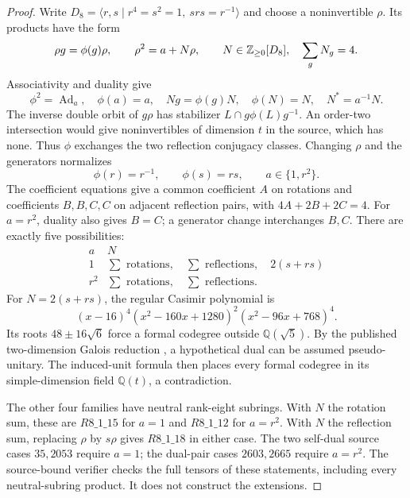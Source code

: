 \begin{proof}
Write $D_8=\langle r,s\mid r^4=s^2=1,\ srs=r^{-1}\rangle$ and
choose a noninvertible $\rho$. Its products have the form
\[
 \rho g=\phi(g)\rho,\qquad \rho^2=a+N\rho,
 \qquad N\in\mathbb Z_{\geq0}[D_8],\quad \sum_gN_g=4.
\]
Associativity and duality give
\[
 \phi^2=\operatorname{Ad}_a,\quad\phi(a)=a,\quad
 Ng=\phi(g)N,\quad\phi(N)=N,\quad N^*=a^{-1}N.
\]
The inverse double orbit of $g\rho$ has stabilizer
$L\cap g\phi(L)g^{-1}$. An order-two intersection would give
noninvertibles of dimension $t$ in the source, which has none.
Thus $\phi$ exchanges the two reflection conjugacy classes.
Changing $\rho$ and the generators normalizes
\[
 \phi(r)=r^{-1},\qquad\phi(s)=rs,\qquad a\in\{1,r^2\}.
\]
The coefficient equations give a common coefficient $A$ on rotations
and coefficients $B,B,C,C$ on adjacent reflection pairs, with
$4A+2B+2C=4$. For $a=r^2$, duality also gives $B=C$; a generator
change interchanges $B,C$. There are exactly five possibilities:
\[
\begin{array}{c|c}
a&N\\\hline
1&\sum\text{ rotations},\quad\sum\text{ reflections},\quad2(s+rs)\\
r^2&\sum\text{ rotations},\quad\sum\text{ reflections}.
\end{array}
\]
For $N=2(s+rs)$, the regular Casimir polynomial is
\[
 (x-16)^4(x^2-160x+1280)^2(x^2-96x+768)^4.
\]
Its roots $48\pm16\sqrt6$ force a formal codegree outside
$\mathbb Q(\sqrt5)$. By the published two-dimension Galois reduction
\cite[Lemma~3.1]{Schopieray}, a hypothetical dual can be assumed
pseudo-unitary. The induced-unit formula
\cite[Theorem~2.13]{OstrikRank3} then places every formal codegree
in its simple-dimension field $\mathbb Q(t)$, a contradiction.

The other four families have neutral rank-eight subrings. With $N$
the rotation sum, these are $R8\_1\_15$ for $a=1$ and
$R8\_1\_12$ for $a=r^2$. With $N$ the reflection sum, replacing
$\rho$ by $s\rho$ gives $R8\_1\_18$ in either case. The two
self-dual source cases $35,2053$ require $a=1$; the dual-pair cases
$2603,2665$ require $a=r^2$. The source-bound verifier checks the
full tensors of these statements, including every neutral-subring
product. It does not construct the extensions.
\end{proof}

